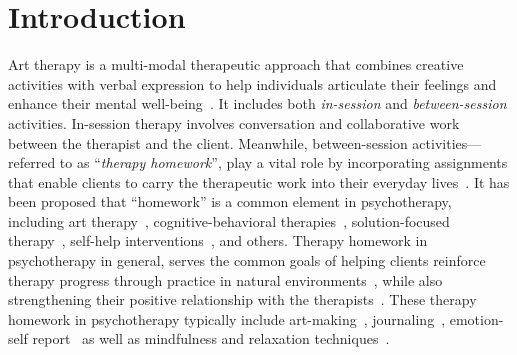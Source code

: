 \section{Introduction}
Art therapy is a multi-modal therapeutic approach that combines creative activities with verbal expression to help individuals articulate their feelings and enhance their mental well-being~\cite{malchiodi2011handbook}.
It includes both \textit{in-session} and \textit{between-session} activities.
In-session therapy involves conversation and collaborative work between the therapist and the client.
Meanwhile, between-session activities---referred to as ``\textit{therapy homework}'', play a vital role by incorporating assignments that enable clients to carry the therapeutic work into their everyday lives~\cite{kazantzis2007handbook}. 
It has been proposed that ``homework'' is a common element in psychotherapy, including art therapy~\cite{heckwolf2014coordinating}, cognitive-behavioral therapies~\cite{kazantzis2007handbook}, solution-focused therapy~\cite{beyebach1996research}, self-help interventions~\cite{jordan1995programmed}, and others.
Therapy homework in psychotherapy in general, serves the common goals of helping clients reinforce therapy progress through practice in natural environments~\cite{beerse2020therapeutic}, while also strengthening their positive relationship with the therapists~\cite{huckvale2009case}.
These therapy homework in psychotherapy typically include art-making~\cite{hoshino2011narrative,barrow2020experiences}, journaling~\cite{borkin2014healing,smith2019visual}, emotion-self report~\cite{nesset2021does} as well as mindfulness and relaxation techniques~\cite{knapp2024daily}. 


